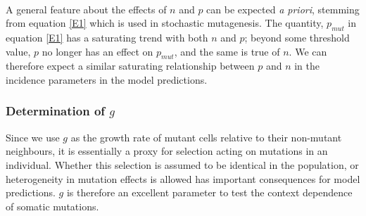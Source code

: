 \documentclass[12pt, onecolumn]{article}
\begin{document}
	\paragraph{\empty}A general feature about the effects of $n$ and $p$ can be expected \textit{a priori}, stemming from equation \ref{E1} which is used in stochastic mutagenesis. The quantity, $p_{mut}$ in equation \ref{E1} has a saturating trend with both $n$ and $p$; beyond some threshold value, $p$ no longer has an effect on $p_{mut}$, and the same is true of $n$. We can therefore expect a similar saturating relationship between $p$ and $n$ in the incidence parameters in the model predictions.
%	 
	
	\subsubsection{Determination of $g$}\label{g value}
	 Since we use $g$ as the growth rate of mutant cells relative to their non-mutant neighbours, it is essentially  a proxy for selection acting on mutations in an individual. Whether this selection is assumed to be identical in the population, or heterogeneity in mutation effects is allowed has important consequences for model predictions. $g$ is therefore an excellent parameter to test the context dependence of somatic mutations.
	 
\end{document}
